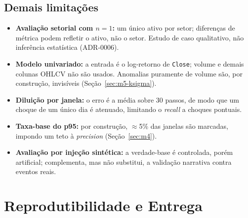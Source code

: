 \subsection{Demais limitações}
\begin{itemize}[noitemsep]
  \item \textbf{Avaliação setorial com $n=1$:} um único ativo por setor; diferenças de métrica
        podem refletir o ativo, não o setor. Estudo de caso qualitativo, não inferência
        estatística (ADR-0006).
  \item \textbf{Modelo univariado:} a entrada é o log-retorno de \texttt{Close}; volume e
        demais colunas OHLCV não são usados. Anomalias puramente de volume são, por
        construção, invisíveis (Seção~\ref{sec:m5-ksigma}).
  \item \textbf{Diluição por janela:} o erro é a média sobre 30 passos, de modo que um choque
        de um único dia é atenuado, limitando o \emph{recall} a choques pontuais.
  \item \textbf{Taxa-base do p95:} por construção, $\approx$5\% das janelas são marcadas,
        impondo um teto à \emph{precision} (Seção~\ref{sec:m4}).
  \item \textbf{Avaliação por injeção sintética:} a verdade-base é controlada, porém artificial;
        complementa, mas não substitui, a validação narrativa contra eventos reais.
\end{itemize}

\section{Reprodutibilidade e Entrega}
\label{sec:repro}

